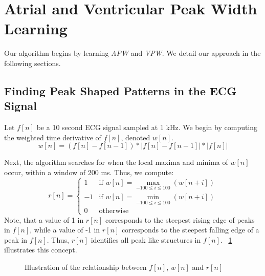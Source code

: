 \documentclass[conference]{IEEEtran}
\newcommand{\APW}{\textit{APW}}
\newcommand{\VPW}{\textit{VPW}}
\begin{document}
\section{Atrial and Ventricular Peak Width Learning}
Our algorithm begins by learning \APW{} and \VPW{}. We
detail our approach in the following sections.

\subsection{Finding Peak Shaped Patterns in the ECG Signal}
Let $f[n]$ be a 10 second ECG signal sampled at 1 kHz.
We begin by computing the weighted time
derivative of $f[n]$, denoted $w[n]$.
\begin{equation}
	w[n]=(f[n]-f[n-1]) * \left|f[n] - f[n-1]\right| * \left|f[n]\right|
\end{equation}

Next, the algorithm searches for when the local
maxima and minima of $w[n]$ occur, within a window of
200 ms. Thus, we compute:
\begin{equation}
	r[n] = \left \{
		\begin{array}{lr}
			1 & \text{if } w[n] = \max\limits_{-100 \le i \le 100} (w[n+i]) \\
			-1 & \text{if } w[n] = \min\limits_{-100 \le i \le 100} (w[n+i]) \\
			0 & \text{otherwise}
		\end{array}
	\right.
\end{equation}
Note, that a value of 1 in $r[n]$ corresponds to the
steepest rising edge of peaks in $f[n]$, while a value of -1
in $r[n]$ corresponds to the steepest falling edge of a peak
in $f[n]$. Thus, $r[n]$ identifies all peak like structures in
$f[n]$.  \figurename~\ref{fig:fwr} illustrates this concept.
\begin{figure}
	\centering
	\caption{
	Illustration of the relationship between $f[n]$, $w[n]$ and $r[n]$}
	\label{fig:fwr}
\end{figure}
\end{document}
